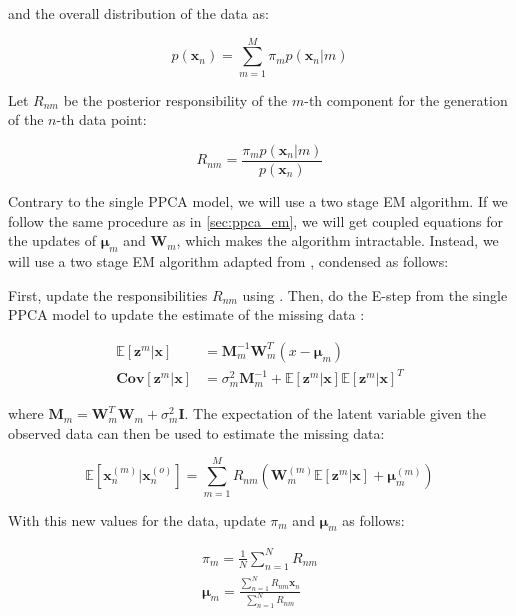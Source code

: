 \documentclass{article}
\newcommand{\E}{\mathbb{E}}
\begin{document}
\noindent and the overall distribution of the data as:

\begin{equation}
    \label{eq:mppca_EM_marginal}
    p(\mathbf{x}_n) = \sum_{m=1}^M \pi_m p(\mathbf{x}_n | m)
\end{equation}

Let $R_{nm}$ be the posterior responsibility of the $m$-th component for the generation of the $n$-th data point:

\begin{equation}
    \label{eq:mppca_EM_responsibility}
    R_{nm} = \frac{\pi_m p(\mathbf{x}_n | m)}{p(\mathbf{x}_n)}
\end{equation}

Contrary to the single PPCA model, we will use a two stage EM algorithm. If we follow the same procedure as in \cref{sec:ppca_em}, we will get coupled equations for the updates of $\boldsymbol{\mu}_m$ and $\mathbf{W}_m$, which makes the algorithm intractable. Instead, we will use a two stage EM algorithm adapted from \citet{MPPCA}, condensed as follows:

First, update the responsibilities $R_{nm}$ using . Then, do the E-step from the single PPCA model to update the estimate of the missing data :

\begin{align}
    \label{eq:mppca_EM_e_step_E}
    \E[\mathbf{z}^m|\mathbf{x}] &= \mathbf{M}_m^{-1}\mathbf{W}_m^{T}\left(x - \boldsymbol{\mu}_m\right) \\
    \label{eq:mppca_EM_e_step_Cov}
    \mathbf{Cov}[\mathbf{z}^m|\mathbf{x}] &= \sigma_m^2\mathbf{M}_m^{-1} + \E[\mathbf{z}^m|\mathbf{x}]\E[\mathbf{z}^m|\mathbf{x}]^T
\end{align}
    
\noindent where $\mathbf{M}_m = \mathbf{W}_m^{T}\mathbf{W}_m + \sigma_m^2\mathbf{I}$. The expectation of the latent variable given the observed data can then be used to estimate the missing data:

\begin{equation}
    \label{eq:mppca_EM_e_step_completion}
    \E[\mathbf{x}_n^{(m)}|\mathbf{x}_n^{(o)}] = \sum_{m=1}^M R_{nm} \left( \mathbf{W}_m^{(m)}\E[\mathbf{z}^m|\mathbf{x}] + \boldsymbol{\mu}_m^{(m)} \right)
\end{equation}

\noindent With this new values for the data, update $\pi_m$ and $\boldsymbol{\mu}_m$ as follows:

\begin{align}
    \label{eq:mppca_EM_pi}
    \pi_m = \frac{1}{N}\sum_{n=1}^N R_{nm}\\
    \label{eq:mppca_EM_mu}
    \boldsymbol{\mu}_m = \frac{\sum_{n=1}^N R_{nm}\mathbf{x}_n}{\sum_{n=1}^N R_{nm}}
\end{align}
\end{document}
